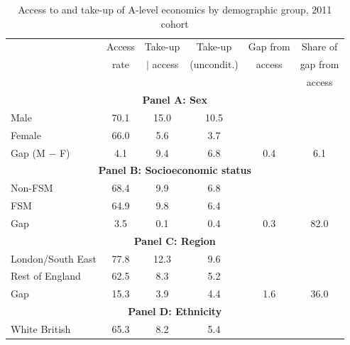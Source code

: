 \begin{table}[htbp]
\centering
\caption{Access to and take-up of A-level economics by demographic group, 2011 cohort}
\label{tab:access_takeup}
\begin{tabular}{l ccccc}
\toprule
                              & Access     & Take-up    & Take-up    & Gap from   & Share of   \\
                              & rate       & $|$ access & (uncondit.)& access     & gap from   \\
                              &            &            &            &            & access     \\
\midrule
\multicolumn{6}{c}{\textbf{Panel A: Sex}} \\
\midrule
Male                          & 70.1         & 15.0         & 10.5         &            &            \\
Female                        & 66.0         & 5.6         & 3.7         &            &            \\
Gap (M $-$ F)                 & 4.1         & 9.4         & 6.8         & 0.4         & 6.1         \\
\midrule
\multicolumn{6}{c}{\textbf{Panel B: Socioeconomic status}} \\
\midrule
Non-FSM                       & 68.4         & 9.9         & 6.8         &            &            \\
FSM                           & 64.9         & 9.8         & 6.4         &            &            \\
Gap                           & 3.5         & 0.1         & 0.4         & 0.3         & 82.0         \\
\midrule
\multicolumn{6}{c}{\textbf{Panel C: Region}} \\
\midrule
London/South East             & 77.8         & 12.3         & 9.6         &            &            \\
Rest of England               & 62.5         & 8.3         & 5.2         &            &            \\
Gap                           & 15.3         & 3.9         & 4.4         & 1.6         & 36.0         \\
\midrule
\multicolumn{6}{c}{\textbf{Panel D: Ethnicity}} \\
\midrule
White British                 & 65.3         & 8.2         & 5.4         &            &            \\

\end{tabular}
\end{table}
